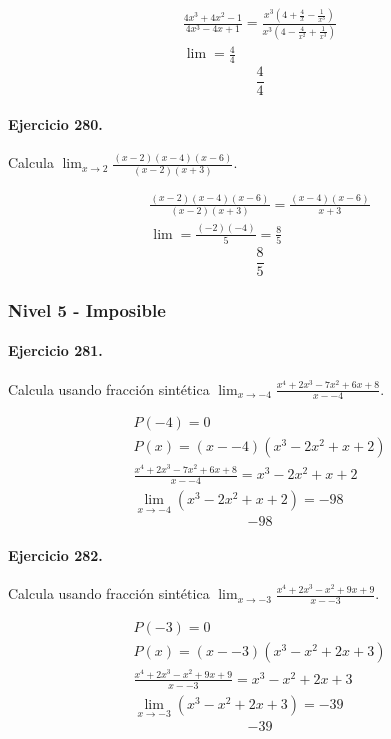 \documentclass[11pt,a4paper]{article}
\begin{document}
\[
\begin{aligned}
\frac{4x^3+4x^2-1}{4x^3-4x+1}=\frac{x^3(4+\frac{4}{x}-\frac{1}{x^3})}{x^3(4-\frac{4}{x^2}+\frac{1}{x^3})}\\
\lim=\frac{4}{4}
\end{aligned}
\]
\[\boxed{\frac{4}{4}}\]


\paragraph{Ejercicio 280.} Calcula $\displaystyle\lim_{x\to 2}\frac{(x-2)(x-4)(x-6)}{(x-2)(x+3)}$. 

\[
\begin{aligned}
\frac{(x-2)(x-4)(x-6)}{(x-2)(x+3)}=\frac{(x-4)(x-6)}{x+3}\\
\lim=\frac{(-2)(-4)}{5}=\frac{8}{5}
\end{aligned}
\]
\[\boxed{\frac{8}{5}}\]


\newpage

\subsubsection*{Nivel 5 - Imposible}

\paragraph{Ejercicio 281.} Calcula usando fracción sintética $\displaystyle\lim_{x\to -4}\frac{x^4 + 2x^3 - 7x^2 + 6x + 8}{x--4}$. 

\[
\begin{aligned}
P(-4)=0\\
P(x)=(x--4)(x^3 - 2x^2 + x + 2)\\
\frac{x^4 + 2x^3 - 7x^2 + 6x + 8}{x--4}=x^3 - 2x^2 + x + 2\\
\lim_{x\to -4}(x^3 - 2x^2 + x + 2)=-98
\end{aligned}
\]
\[\boxed{-98}\]


\paragraph{Ejercicio 282.} Calcula usando fracción sintética $\displaystyle\lim_{x\to -3}\frac{x^4 + 2x^3 - x^2 + 9x + 9}{x--3}$. 

\[
\begin{aligned}
P(-3)=0\\
P(x)=(x--3)(x^3 - x^2 + 2x + 3)\\
\frac{x^4 + 2x^3 - x^2 + 9x + 9}{x--3}=x^3 - x^2 + 2x + 3\\
\lim_{x\to -3}(x^3 - x^2 + 2x + 3)=-39
\end{aligned}
\]
\[\boxed{-39}\]
\end{document}
